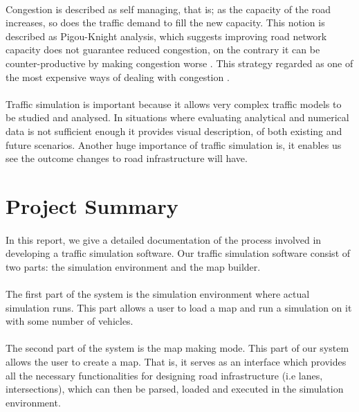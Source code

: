 \documentclass[a4paper,11pt,titlepage]{article}
\begin{document}
\paragraph{}
Congestion is described as self managing, that is; as the capacity of the road increases, so does the traffic demand to fill the new capacity. This notion is described as Pigou-Knight analysis, which suggests improving road network capacity does not guarantee reduced congestion, on the contrary it can be counter-productive by making congestion worse \cite{1,2}. This strategy regarded as one of the most expensive ways of dealing with congestion \cite{2}.
\paragraph{}
Traffic simulation is important because it allows very complex traffic models to be studied and analysed. In situations where evaluating analytical and numerical data is not sufficient enough it provides visual description, of both existing and future scenarios. Another huge importance of traffic simulation is, it enables us see the outcome changes to road infrastructure will have.

\section{Project Summary}
\paragraph{}
In this report, we give a detailed documentation of the process involved in developing a traffic simulation software. Our traffic simulation software consist of two parts: the simulation environment and the map builder. 
\paragraph{}
The first part of the system is the simulation environment where actual simulation runs. This part allows a user to load a map and run a simulation on it with some number of vehicles. 
\paragraph{}
The second part of the system is the map making mode. This part of our system allows the user to create a map. That is, it serves as an interface which provides all the necessary functionalities for designing road infrastructure (i.e lanes, intersections), which can then be parsed, loaded and executed in the simulation environment.
\end{document}
